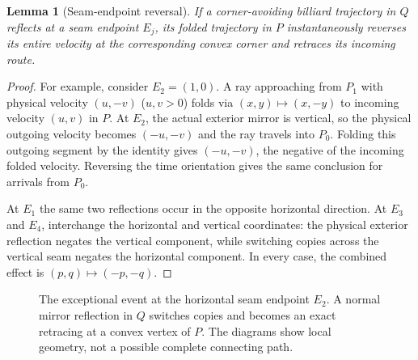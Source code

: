 \documentclass[11pt]{article}
\newtheorem{lemma}{Lemma}
\theoremstyle{remark}
\begin{document}
\begin{lemma}[Seam-endpoint reversal]\label{lem:reversal}
If a corner-avoiding billiard trajectory in $Q$ reflects at a seam endpoint $E_j$, its folded trajectory in $P$ instantaneously \emph{reverses its entire velocity} at the corresponding convex corner and retraces its incoming route.
\end{lemma}
\begin{proof}
For example, consider $E_2=(1,0)$. A ray approaching from $P_1$ with physical velocity $(u,-v)$ ($u,v>0$) folds via $(x,y)\mapsto(x,-y)$ to incoming velocity $(u,v)$ in $P$. At $E_2$, the actual exterior mirror is vertical, so the physical outgoing velocity becomes $(-u,-v)$ and the ray travels into $P_0$. Folding this outgoing segment by the identity gives $(-u,-v)$, the negative of the incoming folded velocity. Reversing the time orientation gives the same conclusion for arrivals from $P_0$.

At $E_1$ the same two reflections occur in the opposite horizontal direction. At $E_3$ and $E_4$, interchange the horizontal and vertical coordinates: the physical exterior reflection negates the vertical component, while switching copies across the vertical seam negates the horizontal component. In every case, the combined effect is $(p,q)\mapsto(-p,-q)$.
\end{proof}

\begin{figure}[htbp]
\centering
{}
\caption{The exceptional event at the horizontal seam endpoint $E_2$. A normal mirror reflection in $Q$ switches copies and becomes an exact retracing at a convex vertex of $P$. The diagrams show local geometry, not a possible complete connecting path.}\label{fig:reverse}
\end{figure}
\end{document}
